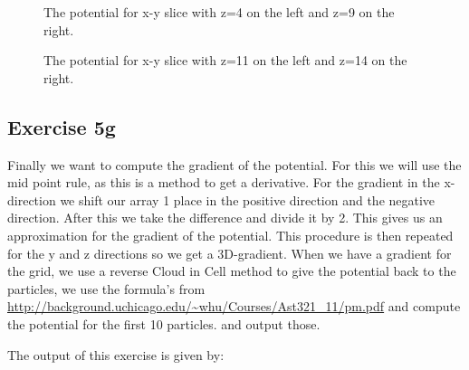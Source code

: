  \begin{figure}
    \centering
    \qquad
    \caption{The potential for x-y slice with z=4 on the left and z=9 on the right.}
  \end{figure}

 \begin{figure}
    \centering
    \qquad
    \caption{The potential for x-y slice with z=11 on the left and z=14 on the right.}
  \end{figure}
  
  \subsection{Exercise 5g}
  Finally we want to compute the gradient of the potential. For this we will use the mid point rule, as this is a method to get a derivative. For the gradient in the x-direction we shift our array 1 place in the positive direction and the negative direction. After this we take the difference and divide it by 2. This gives us an approximation for the gradient of the potential. This procedure is then repeated for the y and z directions so we get a 3D-gradient. 
  When we have a gradient for the grid, we use a reverse Cloud in Cell method to give the potential back to the particles, we use the formula's from \url{http://background.uchicago.edu/~whu/Courses/Ast321_11/pm.pdf} and compute the potential for the first 10 particles. and output those.
  
  The output of this exercise is given by:


  

